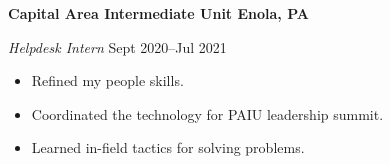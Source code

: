 \textbf{Capital Area Intermediate Unit \hfill  Enola, PA} \par
\textit{Helpdesk Intern} \hfill Sept 2020--Jul 2021 \par
\begin{itemize}
	\item Refined my people skills.
	\item Coordinated the technology for PAIU leadership summit.
	\item Learned in-field tactics for solving problems.
\end{itemize} \par